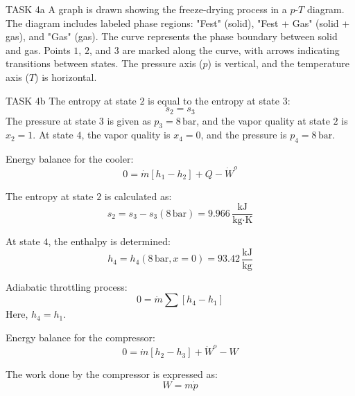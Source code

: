 TASK 4a  
A graph is drawn showing the freeze-drying process in a \( p \)-\( T \) diagram. The diagram includes labeled phase regions: "Fest" (solid), "Fest + Gas" (solid + gas), and "Gas" (gas). The curve represents the phase boundary between solid and gas. Points \( 1 \), \( 2 \), and \( 3 \) are marked along the curve, with arrows indicating transitions between states. The pressure axis (\( p \)) is vertical, and the temperature axis (\( T \)) is horizontal.  

TASK 4b  
The entropy at state \( 2 \) is equal to the entropy at state \( 3 \):  
\[
s_2 = s_3
\]  
The pressure at state \( 3 \) is given as \( p_3 = 8 \, \text{bar} \), and the vapor quality at state \( 2 \) is \( x_2 = 1 \). At state \( 4 \), the vapor quality is \( x_4 = 0 \), and the pressure is \( p_4 = 8 \, \text{bar} \).  

Energy balance for the cooler:  
\[
0 = \dot{m} \left[ h_1 - h_2 \right] + Q - \dot{W}^o
\]  

The entropy at state \( 2 \) is calculated as:  
\[
s_2 = s_3 - s_3(8 \, \text{bar}) = 9.966 \, \frac{\text{kJ}}{\text{kg·K}}
\]  

At state \( 4 \), the enthalpy is determined:  
\[
h_4 = h_4(8 \, \text{bar}, x = 0) = 93.42 \, \frac{\text{kJ}}{\text{kg}}
\]  

Adiabatic throttling process:  
\[
0 = \dot{m} \sum \left[ h_4 - h_1 \right]
\]  
Here, \( h_4 = h_1 \).  

Energy balance for the compressor:  
\[
0 = \dot{m} \left[ h_2 - h_3 \right] + \dot{W}^o - W
\]  

The work done by the compressor is expressed as:  
\[
W = m \dot{p}
\]  